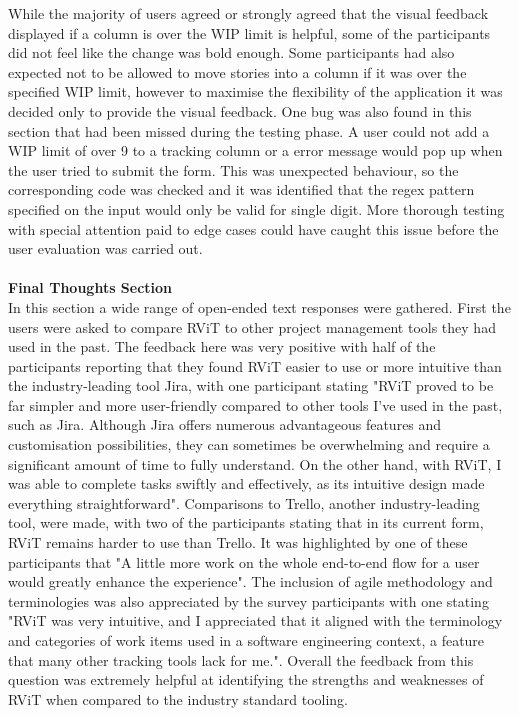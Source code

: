 \documentclass[l4proj.tex]{subfiles}
\begin{document}
While the majority of users agreed or strongly agreed that the visual feedback displayed if a column is over the WIP limit is helpful, some of the participants did not feel like the change was bold enough. Some participants had also expected not to be allowed to move stories into a column if it was over the specified WIP limit, however to maximise the flexibility of the application it was decided only to provide the visual feedback. One bug was also found in this section that had been missed during the testing phase. A user could not add a WIP limit of over 9 to a tracking column or a error message would pop up when the user tried to submit the form. This was unexpected behaviour, so the corresponding code was checked and it was identified that the regex pattern specified on the input would only be valid for single digit. More thorough testing with special attention paid to edge cases could have caught this issue before the user evaluation was carried out.\\
\\
\textbf{Final Thoughts Section}\\
In this section a wide range of open-ended text responses were gathered. First the users were asked to compare RViT to other project management tools they had used in the past. The feedback here was very positive with half of the participants reporting that they found RViT easier to use or more intuitive than the industry-leading tool Jira, with one participant stating "RViT proved to be far simpler and more user-friendly compared to other tools I've used in the past, such as Jira. Although Jira offers numerous advantageous features and customisation possibilities, they can sometimes be overwhelming and require a significant amount of time to fully understand. On the other hand, with RViT, I was able to complete tasks swiftly and effectively, as its intuitive design made everything straightforward". Comparisons to Trello, another industry-leading tool, were made, with two of the participants stating that in its current form, RViT remains harder to use than Trello. It was highlighted by one of these participants that "A little more work on the whole end-to-end flow for a user would greatly enhance the experience". The inclusion of agile methodology and terminologies was also appreciated by the survey participants with one stating "RViT was very intuitive, and I appreciated that it aligned with the terminology and categories of work items used in a software engineering context, a feature that many other tracking tools lack for me.". Overall the feedback from this question was extremely helpful at identifying the strengths and weaknesses of RViT when compared to the industry standard tooling.
\end{document}
